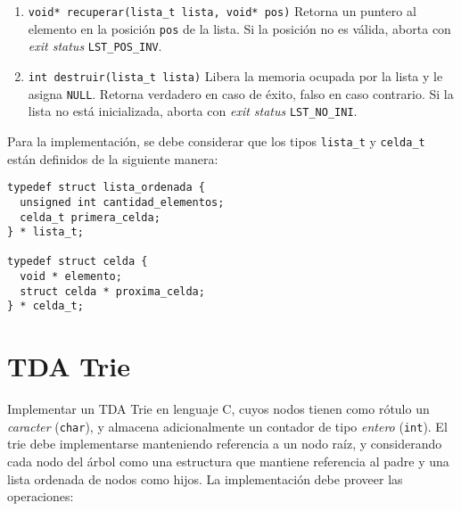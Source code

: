 \documentclass[12pt,a4paper]{article}
\begin{document}
\begin{enumerate}
	\item \texttt{void* recuperar(lista\_t lista, void* pos)} Retorna un puntero al elemento en la posición \texttt{pos} de la lista. Si la posición no es válida, aborta con \emph{exit status} \texttt{LST\_POS\_INV}.
	
	\item \texttt{int destruir(lista\_t lista)} Libera la memoria ocupada por la lista y le asigna \texttt{NULL}. Retorna verdadero en caso de éxito, falso en caso contrario. Si la lista no está inicializada, aborta con \emph{exit status} \texttt{LST\_NO\_INI}.
	
\end{enumerate}

Para la implementación, se debe considerar que los tipos \texttt{lista\_t} y \texttt{celda\_t} están definidos de la siguiente manera:

\begin{verbatim}
typedef struct lista_ordenada {
  unsigned int cantidad_elementos;
  celda_t primera_celda;
} * lista_t;

typedef struct celda {
  void * elemento;
  struct celda * proxima_celda;
} * celda_t;
\end{verbatim}

\section{TDA Trie}

Implementar un TDA Trie en lenguaje C, cuyos nodos tienen como rótulo un \emph{caracter} (\texttt{char}), y almacena adicionalmente un contador de tipo \emph{entero} (\texttt{int}). El trie debe implementarse manteniendo referencia a un nodo raíz, y considerando cada nodo del árbol como una estructura que mantiene referencia al padre y una lista ordenada de nodos como hijos. La implementación debe proveer las operaciones:
\end{document}
